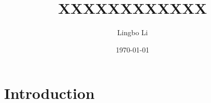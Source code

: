 \documentclass[12pt]{article}
\title{\textbf{XXXXXXXXXXXX}}
\author{Lingbo Li}
\date{\today}
\begin{document}
\maketitle

\section{Introduction}
\end{document}
